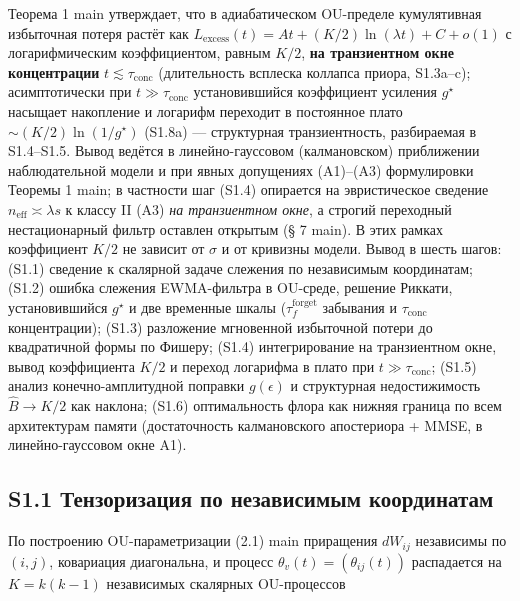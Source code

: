 \documentclass[12pt]{iopart}
\begin{document}
Теорема 1 main утверждает, что в адиабатическом OU-пределе кумулятивная избыточная потеря растёт как \(L_{\text{excess}}(t) = A t + (K/2)\ln(\lambda t) + C + o(1)\) с логарифмическим коэффициентом, равным \(K/2\), \textbf{на транзиентном окне концентрации} \(t \lesssim \tau_{\text{conc}}\) (длительность всплеска коллапса приора, S1.3a--c); асимптотически при \(t \gg \tau_{\text{conc}}\) установившийся коэффициент усиления \(g^\star\) насыщает накопление и логарифм переходит в постоянное плато \(\sim(K/2)\ln(1/g^\star)\) (S1.8a) --- структурная транзиентность, разбираемая в S1.4--S1.5. Вывод ведётся в линейно-гауссовом (калмановском) приближении наблюдательной модели и при явных допущениях (A1)--(A3) формулировки Теоремы 1 main; в частности шаг (S1.4) опирается на эвристическое сведение \(n_{\text{eff}} \asymp \lambda s\) к классу II (A3) \emph{на транзиентном окне}, а строгий переходный нестационарный фильтр оставлен открытым (§ 7 main). В этих рамках коэффициент \(K/2\) не зависит от \(\sigma\) и от кривизны модели. Вывод в шесть шагов: (S1.1) сведение к скалярной задаче слежения по независимым координатам; (S1.2) ошибка слежения EWMA-фильтра в OU-среде, решение Риккати, установившийся \(g^\star\) и две временные шкалы (\(\tau_f^{\text{forget}}\) забывания и \(\tau_{\text{conc}}\) концентрации); (S1.3) разложение мгновенной избыточной потери до квадратичной формы по Фишеру; (S1.4) интегрирование на транзиентном окне, вывод коэффициента \(K/2\) и переход логарифма в плато при \(t \gg \tau_{\text{conc}}\); (S1.5) анализ конечно-амплитудной поправки \(g(\epsilon)\) и структурная недостижимость \(\hat B \to K/2\) как наклона; (S1.6) оптимальность флора как нижняя граница по всем архитектурам памяти (достаточность калмановского апостериора + MMSE, в линейно-гауссовом окне A1).



\subsection{S1.1 Тензоризация по независимым координатам}\label{s1.1-ux442ux435ux43dux437ux43eux440ux438ux437ux430ux446ux438ux44f-ux43fux43e-ux43dux435ux437ux430ux432ux438ux441ux438ux43cux44bux43c-ux43aux43eux43eux440ux434ux438ux43dux430ux442ux430ux43c}



По построению OU-параметризации (2.1) main приращения \(dW_{ij}\) независимы по \((i,j)\), ковариация диагональна, и процесс \(\theta_v(t) = (\theta_{ij}(t))\) распадается на \(K = k(k-1)\) независимых скалярных OU-процессов
\end{document}
